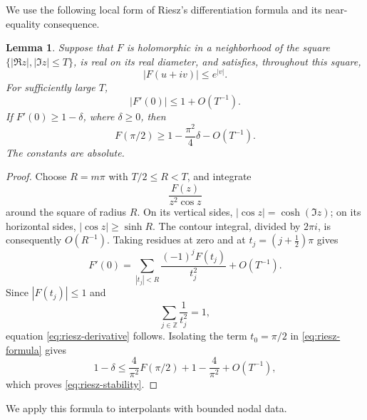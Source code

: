 \documentclass[11pt]{article}
\newtheorem{lemma}[theorem]{Lemma}
\numberwithin{equation}{section}
\begin{document}
We use the following local form of Riesz's differentiation formula and its
near-equality consequence.

\begin{lemma}\label{lem:riesz}
Suppose that \(F\) is holomorphic in a neighborhood of the square \(\{|\Re
z|,|\Im z|\le T\}\), is real on its real diameter, and satisfies, throughout this square,
\[
 |F(u+iv)|\le e^{|v|}.
\]
For sufficiently large \(T\),
\begin{equation}\label{eq:riesz-derivative}
 |F'(0)|\le 1+O(T^{-1}).
\end{equation}
If \(F'(0)\ge 1-\delta\), where \(\delta\ge0\), then
\begin{equation}\label{eq:riesz-stability}
 F(\pi/2)\ge 1-\frac{\pi^2}{4}\delta-O(T^{-1}).
\end{equation}
The constants are absolute.

\end{lemma}

\begin{proof}
Choose \(R=m\pi\) with \(T/2\le R<T\), and integrate
\[
 \frac{F(z)}{z^2\cos z}
\]
around the square of radius \(R\). On its vertical sides, \(|\cos z|=\cosh(\Im
z)\); on its horizontal sides, \(|\cos z|\ge\sinh R\). The contour integral,
divided by \(2\pi i\), is consequently \(O(R^{-1})\). Taking residues at zero
and at \(t_j=(j+\tfrac12)\pi\) gives
\begin{equation}\label{eq:riesz-formula}
 F'(0)=\sum_{|t_j|<R}\frac{(-1)^jF(t_j)}{t_j^2}+O(T^{-1}).
\end{equation}
Since \(|F(t_j)|\le1\) and
\[
 \sum_{j\in\mathbb Z}\frac1{t_j^2}=1,
\]
equation \eqref{eq:riesz-derivative} follows. Isolating the term \(t_0=\pi/2\)
in \eqref{eq:riesz-formula} gives
\[
 1-\delta\le \frac4{\pi^2}F(\pi/2)+1-\frac4{\pi^2}+O(T^{-1}),
\]
which proves \eqref{eq:riesz-stability}.
\end{proof}

We apply this formula to interpolants with bounded nodal data.
\end{document}

